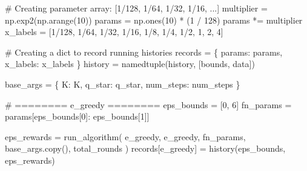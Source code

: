 \documentclass[
  letterpaper,
]{krantz}
\makeatletter
\newenvironment{Shaded}{\begin{snugshade}}{\end{snugshade}}
\newcommand{\CommentTok}[1]{\textcolor[rgb]{0.37,0.37,0.37}{#1}}
\newcommand{\DecValTok}[1]{\textcolor[rgb]{0.68,0.00,0.00}{#1}}
\newcommand{\NormalTok}[1]{\textcolor[rgb]{0.00,0.23,0.31}{#1}}
\newcommand{\OperatorTok}[1]{\textcolor[rgb]{0.37,0.37,0.37}{#1}}
\newcommand{\StringTok}[1]{\textcolor[rgb]{0.13,0.47,0.30}{#1}}
\newenvironment{kframe}{%
\medskip{}
\setlength{\fboxsep}{.8em}
 \def\at@end@of@kframe{}%
 \ifinner\ifhmode%
  \def\at@end@of@kframe{\end{minipage}}%
  \begin{minipage}{\columnwidth}%
 \fi\fi%
 \def\FrameCommand##1{\hskip\@totalleftmargin \hskip-\fboxsep
 \colorbox{shadecolor}{##1}\hskip-\fboxsep
     \hskip-\linewidth \hskip-\@totalleftmargin \hskip\columnwidth}%
 \MakeFramed {\advance\hsize-\width
   \@totalleftmargin\z@ \linewidth\hsize
   \@setminipage}}%
 {\par\unskip\endMakeFramed%
 \at@end@of@kframe}
\renewenvironment{Shaded}{\begin{kframe}}{\end{kframe}}
\theoremstyle{plain}
\theoremstyle{definition}
\theoremstyle{definition}
\theoremstyle{remark}
\makeatother
\begin{document}
\begin{codelisting}
\begin{Shaded}
\begin{Highlighting}[]
    \CommentTok{\# Creating parameter array: [1/128, 1/64, 1/32, 1/16, ...]}
\NormalTok{    multiplier }\OperatorTok{=}\NormalTok{ np.exp2(np.arange(}\DecValTok{10}\NormalTok{))}
\NormalTok{    params }\OperatorTok{=}\NormalTok{ np.ones(}\DecValTok{10}\NormalTok{) }\OperatorTok{*}\NormalTok{ (}\DecValTok{1} \OperatorTok{/} \DecValTok{128}\NormalTok{)}
\NormalTok{    params }\OperatorTok{*=}\NormalTok{ multiplier}
\NormalTok{    x\_labels }\OperatorTok{=}\NormalTok{ [}\StringTok{\textquotesingle{}1/128\textquotesingle{}}\NormalTok{, }\StringTok{\textquotesingle{}1/64\textquotesingle{}}\NormalTok{, }\StringTok{\textquotesingle{}1/32\textquotesingle{}}\NormalTok{, }\StringTok{\textquotesingle{}1/16\textquotesingle{}}\NormalTok{, }\StringTok{\textquotesingle{}1/8\textquotesingle{}}\NormalTok{, }\StringTok{\textquotesingle{}1/4\textquotesingle{}}\NormalTok{, }\StringTok{\textquotesingle{}1/2\textquotesingle{}}\NormalTok{, }\StringTok{\textquotesingle{}1\textquotesingle{}}\NormalTok{, }\StringTok{\textquotesingle{}2\textquotesingle{}}\NormalTok{,}
                \StringTok{\textquotesingle{}4\textquotesingle{}}\NormalTok{]}
    
    \CommentTok{\# Creating a dict to record running histories}
\NormalTok{    records }\OperatorTok{=}\NormalTok{ \{}
            \StringTok{\textquotesingle{}params\textquotesingle{}}\NormalTok{: params,}
            \StringTok{\textquotesingle{}x\_labels\textquotesingle{}}\NormalTok{: x\_labels}
\NormalTok{            \}}
\NormalTok{    history }\OperatorTok{=}\NormalTok{ namedtuple(}\StringTok{\textquotesingle{}history\textquotesingle{}}\NormalTok{, [}\StringTok{\textquotesingle{}bounds\textquotesingle{}}\NormalTok{, }\StringTok{\textquotesingle{}data\textquotesingle{}}\NormalTok{])}
    
\NormalTok{    base\_args }\OperatorTok{=}\NormalTok{ \{}
            \StringTok{\textquotesingle{}K\textquotesingle{}}\NormalTok{: K,}
            \StringTok{\textquotesingle{}q\_star\textquotesingle{}}\NormalTok{: q\_star,}
            \StringTok{\textquotesingle{}num\_steps\textquotesingle{}}\NormalTok{: num\_steps}
\NormalTok{            \}}
    
    \CommentTok{\# ======== e\_greedy ========}
\NormalTok{    eps\_bounds }\OperatorTok{=}\NormalTok{ [}\DecValTok{0}\NormalTok{, }\DecValTok{6}\NormalTok{]}
\NormalTok{    fn\_params }\OperatorTok{=}\NormalTok{ params[eps\_bounds[}\DecValTok{0}\NormalTok{]: eps\_bounds[}\DecValTok{1}\NormalTok{]]}
    
\NormalTok{    eps\_rewards }\OperatorTok{=}\NormalTok{ run\_algorithm(}
        \StringTok{\textquotesingle{}e\_greedy\textquotesingle{}}\NormalTok{, e\_greedy, fn\_params, base\_args.copy(), total\_rounds}
\NormalTok{        )}
\NormalTok{    records[}\StringTok{\textquotesingle{}e\_greedy\textquotesingle{}}\NormalTok{] }\OperatorTok{=}\NormalTok{ history(eps\_bounds, eps\_rewards)}
    

\end{Highlighting}
\end{Shaded}
\end{codelisting}
\end{document}
